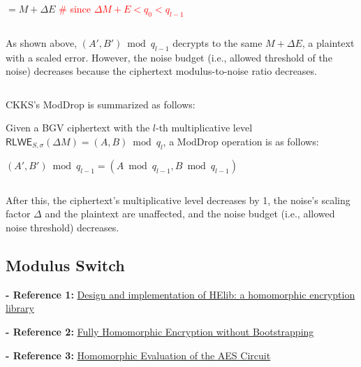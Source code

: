 $= M + \Delta E$ \textcolor{red}{\# since $\Delta M + E < q_0 < q_{l-1}$}

$ $

As shown above, $(A', B') \bmod q_{l-1}$ decrypts to the same $M + \Delta E$, a plaintext with a scaled error. However, the noise budget (i.e., allowed threshold of the noise) decreases because the ciphertext modulus-to-noise ratio decreases. 

$ $

CKKS's \textsf{ModDrop} is summarized as follows:



\begin{tcolorbox}[title={\textbf{\tboxlabel{\ref*{subsec:bgv-mult-plain}} BGV's \textsf{ModDrop}}}]

Given a BGV ciphertext with the $l$-th multiplicative level $\textsf{RLWE}_{S, \sigma}(\Delta M) = (A, B) \bmod q_l$, a \textsf{ModDrop} operation is as follows: 

$(A', B') \bmod q_{l-1} = (A \bmod q_{l-1}, B \bmod q_{l-1})$

$ $

After this, the ciphertext's multiplicative level decreases by 1, the noise's scaling factor $\Delta$ and the plaintext are unaffected, and the noise budget (i.e., allowed noise threshold) decreases. 

\end{tcolorbox}



\subsection{Modulus Switch}
\label{subsec:bgv-modulus-switch}

\noindent \textbf{- Reference 1:} 
\href{https://eprint.iacr.org/2020/1481}{Design and implementation of HElib: a homomorphic encryption library}~\cite{bgv-modswitch1}


\noindent \textbf{- Reference 2:} 
\href{https://eprint.iacr.org/2011/277.pdf}{Fully Homomorphic Encryption without Bootstrapping}~\cite{bgv-modswitch2}


\noindent \textbf{- Reference 3:} 
\href{https://eprint.iacr.org/2012/099.pdf}{Homomorphic Evaluation of the AES Circuit}~\cite{bgv-modswitch3}

